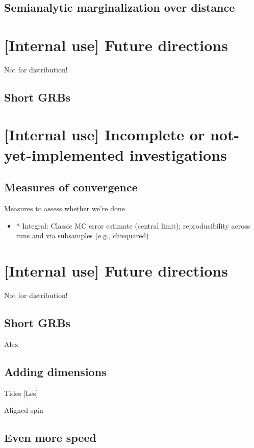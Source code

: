 \subsection{Semianalytic marginalization over distance}


\section{[Internal use] Future directions}

Not for distribution!

\subsection{Short GRBs}


\section{[Internal use] Incomplete or not-yet-implemented investigations}

\subsection{Measures of convergence}

Measures to assess whether we're done
\begin{itemize}
\item * Integral: Classic MC error estimate (central limit); reproducibility across runs and via subsamples (e.g., chisquared)
\end{itemize}

\section{[Internal use] Future directions}

Not for distribution!

\subsection{Short GRBs}

Alex

\subsection{Adding dimensions}

Tides [Les]

Aligned spin

\subsection{Even more speed}

